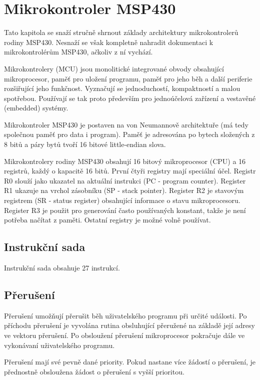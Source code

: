 
\chapter{Mikrokontroler MSP430}

Tato kapitola se snaží stručně shrnout základy architektury mikrokontrolerů rodiny MSP430. Nesnaží se však kompletně nahradit dokumentaci k mikrokontrolérům
MSP430, ačkoliv z ní vychází.

Mikrokontrolery (MCU) jsou monolitické integrované obvody obsahující mikroprocesor, paměť pro uložení programu, paměť pro jeho běh a další periferie
rozšiřující jeho funkčnost. Vyznačují se jednoduchostí, kompaktností a malou spotřebou. Používají se tak proto především pro jednoúčelová zařízení a 
vestavěné (embedded) systémy.

Mikrokontroler MSP430 je postaven na von Neumannově architektuře (má tedy společnou paměť pro data i program). Paměť je adresována po bytech složených z 8 bitů a páry bytů tvoří 16 bitové little-endian slova.

Mikrokontrolery rodiny MSP430 obsahují 16 bitový mikroprocesor (CPU) a 16 registrů, každý o kapacitě 16 bitů. První čtyři registry mají speciální účel. Registr R0 slouží jako ukazatel na aktuální instrukci (PC - program counter). Register R1 ukazuje na vrchol zásobníku (SP - stack pointer). Register R2 je stavovým registrem (SR - status register) obsahující informace o stavu mikroprocesoru. Register R3 je použit pro generování často používaných konstant, takže je není potřeba načítat z paměti. Ostatní registry je možné volně používat.

\section{Instrukční sada}

Instrukční sada obsahuje 27 instrukcí.

\section{Přerušení}

Přerušení umožňují přerušit běh uživatelského programu při určité události. Po příchodu přerušení je vyvolána rutina obsluhující přeružené na základě její adresy ve vektoru přerušení. Po obsloužení přerušení mikroprocesor pokračuje dále ve vykonávaní uživatelského programu.

Přerušení mají své pevně dané priority. Pokud nastane více žádostí o přerušení, je přednostně obsloužena žádost o přerušení s vyšší prioritou.

